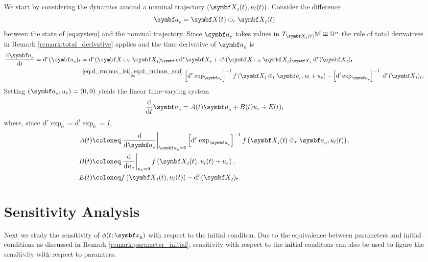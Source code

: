 We start by considering the dynamics around a nominal trajectory $(\X_l(t), u_l(t))$. Consider the difference
\begin{equation}
  \a_e = \X(t) \ominus_r \X_l(t)
\end{equation}
between the state of \eqref{eq:system} and the nominal trajectory. Since $\a_e$ takes values in $T_{\X_l(t)} \M \cong \mathbb{R}^n$ the rule of total derivatives in Remark \ref{remark:total_derivative} applies and the time derivative of $\a_e$ is
\begin{equation}
  \label{eq:linearized_system}
  \begin{aligned}
    \frac{\mathrm{d} \a_e}{\mathrm{d}t} = \mathrm{d}^r (\a_e)_t
     & = \mathrm{d}^r (\X \ominus_r \X_l)_\X \mathrm{d}^r \X_t + \mathrm{d}^r (\X \ominus_r \X_l)_{\X_l} \; \mathrm{d}^r (\X_l)_t
    \\
     & \overset{\eqref{eq:d_rminus_fst}, \eqref{eq:d_rminus_snd}}= \left[\mathrm{d}^r \exp_{\a_e} \right]^{-1} f\left(\X_l \oplus_r \a_e, u_l + u_e \right) - \left[\mathrm{d}^l \exp _{\a_e} \right]^{-1} \; \mathrm{d}^r (\X_l)_t,
  \end{aligned}
\end{equation}
Setting $(\a_e, u_e) = (0, 0)$ yields the linear time-varying system
\begin{equation}
  \frac{\mathrm{d}}{\mathrm{d}t} \a_e = A(t) \a_e + B(t) u_e + E(t),
\end{equation}
where, since $\mathrm{d}^r \exp_0 = \mathrm{d}^l \exp_0 = I$,
\begin{align}
  A(t) & \coloneq \left. \frac{\mathrm{d}}{\mathrm{d}\a_e} \right|_{\a_e = 0} \left[\mathrm{d}^r \exp_{\a_e} \right]^{-1} f\left(\X_l(t) \oplus_r \a_e, u_l(t)  \right), \\
  B(t) & \coloneq \left. \frac{\mathrm{d}}{\mathrm{d}u_e} \right|_{u_e = 0} f\left(\X_l(t), u_l(t) + u_e \right),                                                        \\
  E(t) & \coloneq f\left(\X_l(t), u_l(t) \right) - \mathrm{d}^r(\X_l)_t.
\end{align}


\section{Sensitivity Analysis}

Next we study the sensitivity of $\phi(t; \x_0)$ with respect to the initial conditon. Due to the equivalence between parameters and initial conditions as discussed in Remark \ref{remark:parameter_initial}, sensitivity with respect to the initial conditons can also be used to figure the sensitivity with respect to paramters.

